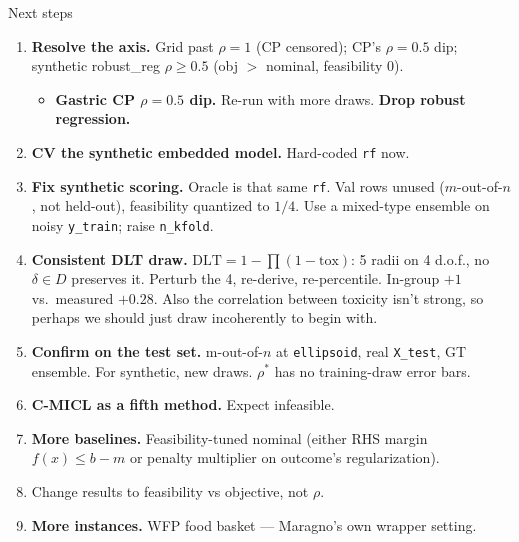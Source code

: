 \documentclass{beamer}
\begin{document}
\begin{frame}{Next steps}
  \footnotesize
  \begin{enumerate}
    \item \textbf{Resolve the axis.} Grid past $\rho{=}1$ (CP censored); CP's
      $\rho{=}0.5$ dip; synthetic robust\_reg $\rho\ge0.5$ (obj $>$ nominal,
      feasibility $0$). 
      \begin{itemize}
        \item \textbf{Gastric CP $\rho{=}0.5$ dip.} Re-run with more draws.
          \textbf{Drop robust regression.}
      \end{itemize}
    \item \textbf{CV the synthetic embedded model.} Hard-coded \texttt{rf} now.
    \item \textbf{Fix synthetic scoring.} Oracle is that same \texttt{rf}. Val rows unused
      ($m$-out-of-$n$, not held-out), feasibility quantized to $1/4$. Use a
      mixed-type ensemble on noisy \texttt{y\_train}; raise \texttt{n\_kfold}.
    \item \textbf{Consistent DLT draw.} $\mathrm{DLT}=1-\prod(1-\mathrm{tox})$:
      5 radii on 4 d.o.f., no $\delta\in D$ preserves it. Perturb the 4,
      re-derive, re-percentile. In-group $+1$ vs.\ measured $+0.28$.
      Also the correlation between toxicity isn't strong, so perhaps we should
      just draw incoherently to begin with.
    \item \textbf{Confirm on the test set.} m-out-of-$n$ at \texttt{ellipsoid},
      real \texttt{X\_test}, GT ensemble. For synthetic, new draws. 
      $\rho^*$ has no training-draw error bars.
    \item \textbf{C-MICL as a fifth method.} Expect infeasible.
    \item \textbf{More baselines.} Feasibility-tuned nominal (either RHS margin
      $f(x) \leq b -m$ or penalty multiplier on outcome's regularization).
    \item Change results to feasibility vs objective, not $\rho$.
    \item \textbf{More instances.} WFP food basket --- Maragno's own wrapper
      setting.
  \end{enumerate}
\end{frame}
\end{document}
